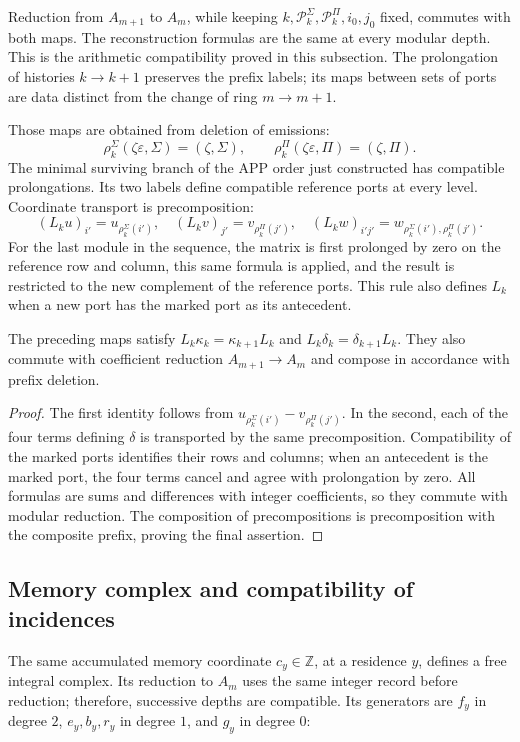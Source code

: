 Reduction from \(A_{m+1}\) to \(A_m\), while keeping
\(k,\mathscr P_k^\Sigma,\mathscr P_k^\Pi,i_0,j_0\) fixed, commutes with both
maps. The reconstruction formulas are the same at every modular
depth. This is the arithmetic compatibility proved in this subsection. The
prolongation of histories \(k\to k+1\) preserves the prefix labels; its
maps between sets of ports are data distinct from the change of
ring \(m\to m+1\).

Those maps are obtained from deletion of emissions:
\[
\rho_k^\Sigma(\zeta\varepsilon,\Sigma)=(\zeta,\Sigma),\qquad
\rho_k^\Pi(\zeta\varepsilon,\Pi)=(\zeta,\Pi).
\]
The minimal surviving branch of the APP order just constructed has compatible prolongations. Its two labels define compatible reference ports at every level. Coordinate transport is precomposition:
\[
(L_ku)_{i'}=u_{\rho_k^\Sigma(i')},\quad
(L_kv)_{j'}=v_{\rho_k^\Pi(j')},\quad
(L_kw)_{i'j'}=w_{\rho_k^\Sigma(i'),\rho_k^\Pi(j')}.
\]
For the last module in the sequence, the matrix is first prolonged by zero on the reference row and column, this same formula is applied, and the result is restricted to the new complement of the reference ports. This rule also defines \(L_k\) when a new port has the marked port as its antecedent.

\begin{proposition}
\label{iv:rectangular-natural}
The preceding maps satisfy
\(L_k\kappa_k=\kappa_{k+1}L_k\) and
\(L_k\delta_k=\delta_{k+1}L_k\).
They also commute with coefficient reduction
\(A_{m+1}\to A_m\) and compose in accordance with prefix deletion.
\end{proposition}
\begin{proof}
The first identity follows from
\(u_{\rho_k^\Sigma(i')}-v_{\rho_k^\Pi(j')}\).
In the second, each of the four terms defining \(\delta\)
is transported by the same precomposition. Compatibility of the
marked ports identifies their rows and columns; when an antecedent is
the marked port, the four terms cancel and agree with
prolongation by zero. All formulas are sums and differences with
integer coefficients, so they commute with modular reduction.
The composition of precompositions is precomposition with the
composite prefix, proving the final assertion.
\end{proof}

\subsection{Memory complex and compatibility of incidences}
The same accumulated memory coordinate \(c_y\in\mathbb Z\), at a residence \(y\), defines a free integral complex. Its reduction to \(A_m\) uses the same integer record before reduction; therefore, successive depths are compatible. Its generators are \(f_y\) in degree \(2\), \(e_y,b_y,r_y\) in degree \(1\), and \(g_y\) in degree \(0\):

